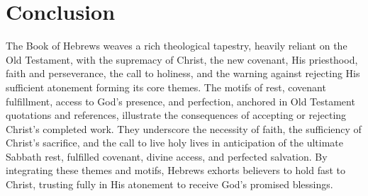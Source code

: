 \documentclass[12pt]{article}
\begin{document}
\section{Conclusion}
The Book of Hebrews weaves a rich theological tapestry, heavily reliant on the
Old Testament, with the supremacy of Christ, the new covenant, His priesthood,
faith and perseverance, the call to holiness, and the warning against rejecting
His sufficient atonement forming its core themes. The motifs of rest, covenant
fulfillment, access to God’s presence, and perfection, anchored in Old
Testament quotations and references, illustrate the consequences of accepting
or rejecting Christ’s completed work. They underscore the necessity of faith,
the sufficiency of Christ’s sacrifice, and the call to live holy lives in
anticipation of the ultimate Sabbath rest, fulfilled covenant, divine access,
and perfected salvation. By integrating these themes and motifs, Hebrews
exhorts believers to hold fast to Christ, trusting fully in His atonement to
receive God’s promised blessings.
\end{document}
